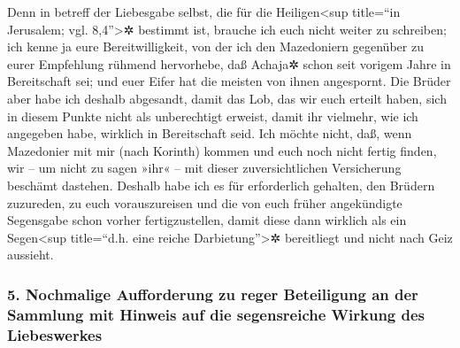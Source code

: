  Denn in betreff der Liebesgabe selbst, die für die
Heiligen\textless sup title=``in Jerusalem; vgl. 8,4''\textgreater✲
bestimmt ist, brauche ich euch nicht weiter zu schreiben; 
ich kenne ja eure Bereitwilligkeit, von der ich den Mazedoniern
gegenüber zu eurer Empfehlung rühmend hervorhebe, daß Achaja✲ schon seit
vorigem Jahre in Bereitschaft sei; und euer Eifer hat die meisten von
ihnen angespornt.  Die Brüder aber habe ich deshalb
abgesandt, damit das Lob, das wir euch erteilt haben, sich in diesem
Punkte nicht als unberechtigt erweist, damit ihr vielmehr, wie ich
angegeben habe, wirklich in Bereitschaft seid.  Ich möchte
nicht, daß, wenn Mazedonier mit mir (nach Korinth) kommen und euch noch
nicht fertig finden, wir -- um nicht zu sagen »ihr« -- mit dieser
zuversichtlichen Versicherung beschämt dastehen.  Deshalb
habe ich es für erforderlich gehalten, den Brüdern zuzureden, zu euch
vorauszureisen und die von euch früher angekündigte Segensgabe schon
vorher fertigzustellen, damit diese dann wirklich als ein
Segen\textless sup title=``d.h. eine reiche Darbietung''\textgreater✲
bereitliegt und nicht nach Geiz aussieht.

\hypertarget{nochmalige-aufforderung-zu-reger-beteiligung-an-der-sammlung-mit-hinweis-auf-die-segensreiche-wirkung-des-liebeswerkes}{%
\subsubsection{5. Nochmalige Aufforderung zu reger Beteiligung an der
Sammlung mit Hinweis auf die segensreiche Wirkung des
Liebeswerkes}\label{nochmalige-aufforderung-zu-reger-beteiligung-an-der-sammlung-mit-hinweis-auf-die-segensreiche-wirkung-des-liebeswerkes}}

